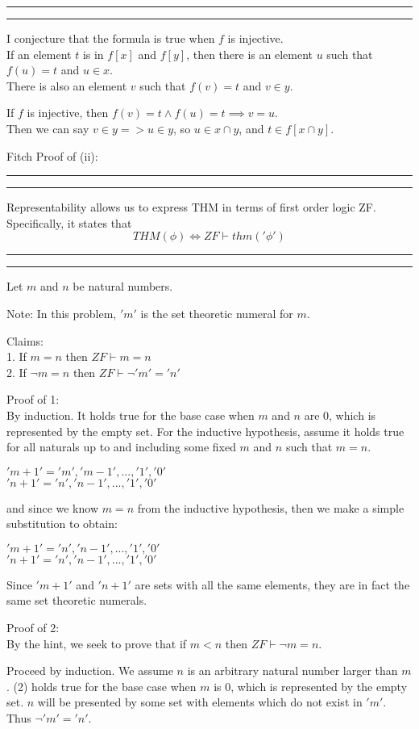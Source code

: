\documentclass[11pt,letterpaper]{article}
\newcommand{\question}[1] {\vspace{.25in} \hrule\vspace{0.5em}
\noindent{\bf #1} \vspace{0.5em}
\hrule \vspace{.10in}}
\begin{document}
\question{2.iii}
I conjecture that the formula is true when $f$ is injective.\\

If an element $t$ is in $f[x]$ and $f[y]$, then there is an element $u$ such that $f(u) = t$ and $u \in x$.\\
There is also an element $v$ such that $f(v) = t$ and $v \in y$.

If $f$ is injective, then $f(v) = t \wedge f(u) = t \implies v = u$.\\
Then we can say $v \in y => u \in y$, so $u \in x \cap y$, and $t \in f[x \cap y]$.

Fitch Proof of (ii):\\

\question{3.i}
Representability allows us to express THM in terms of first order logic ZF. Specifically,
it states that
$$THM(\phi) \iff  ZF \vdash thm('\phi')$$

\question{3.ii}
Let $m$ and $n$ be natural numbers.

Note: In this problem, $'m'$ is the set theoretic numeral for $m$.

Claims:\\
1. If $m = n$ then $ZF \vdash m=n$\\
2. If $\neg m = n$ then $ZF \vdash \neg 'm'='n'$

Proof of 1:\\

By induction. It holds true for the base case when $m$ and $n$ are 0, which
is represented by the empty set. For the inductive hypothesis, assume it holds
true for all naturals up to and including some fixed $m$ and $n$ such that $m = n$.

$'m+1' = {'m','m-1', ..., '1', '0'}$\\
$'n+1' = {'n','n-1', ..., '1', '0'}$

and since we know $m=n$ from the inductive hypothesis, then we make a simple substitution to obtain:

$'m+1' = {'n','n-1', ..., '1', '0'}$\\
$'n+1' = {'n','n-1', ..., '1', '0'}$

Since $'m+1'$ and $'n+1'$ are sets with all the same elements, they are in fact the same set theoretic numerals.

Proof of 2:\\

By the hint, we seek to prove that if $m<n$ then $ZF \vdash \neg m = n$.

Proceed by induction.
We assume $n$ is an arbitrary natural number larger than $m$.
(2) holds true for the base case when $m$ is 0, which
is represented by the empty set. $n$ will be presented by some set with elements which do not exist in $'m'$. Thus $\neg 'm' = 'n'$.
\end{document}
